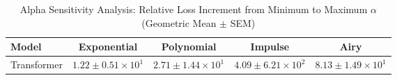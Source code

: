
\begin{table}[h]
\centering
\caption{Alpha Sensitivity Analysis: Relative Loss Increment from Minimum to Maximum $\alpha$ (Geometric Mean $\pm$ SEM)}
\label{tab:alpha_sensitivity}
\begin{tabular}{lcccc}
\hline
Model & Exponential & Polynomial & Impulse & Airy \\
\hline
Transformer & $1.22 \pm 0.51 \times 10^{1}$ & $2.71 \pm 1.44 \times 10^{1}$ & $4.09 \pm 6.21 \times 10^{2}$ & $8.13 \pm 1.49 \times 10^{1}$ \\
\hline
\end{tabular}
\end{table}
